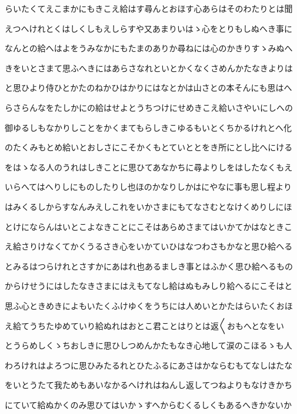\documentclass[a4paper,11pt,landscape]{ltjtarticle}
\begin{document}
\par\medskip
らいたくてえこまかにもきこえ給はす尋んとおほす心あらはそのわたりとは聞
\par\medskip
えつへけれとくはしくしもえしらすや又あまりいはゝ心をとりもしぬへき事に
\par\medskip
なんとの給へはよをうみなかにもたまのありか尋ねには心のかきりすゝみぬへ
\par\medskip
きをいとさまて思ふへきにはあらさなれといとかくなくさめんかたなきよりは
\par\medskip
と思ひより侍ひとかたのねかひはかりにはなとかは山さとの本そんにも思はへ
\par\medskip
らさらんなをたしかにの給はせよとうちつけにせめきこえ給いさやいにしへの
\par\medskip
御ゆるしもなかりしことをかくまてもらしきこゆるもいとくちかるけれとへ化
\par\medskip
のたくみもとめ給いとおしさにこそかくもとていととをき所にとし比へにける
\par\medskip
をはゝなる人のうれはしきことに思ひてあなかちに尋よりしをはしたなくもえ
\par\medskip
いらへてはへりしにものしたりし也ほのかなりしかはにやなに事も思し程より
\par\medskip
はみくるしからすなんみえしこれをいかさまにもてなさむとなけくめりしにほ
\par\medskip
とけにならんはいとこよなきことにこそはあらめさまてはいかてかはなときこ
\par\medskip
え給さりけなくてかくうるさき心をいかていひはなつわさもかなと思ひ給へる
\par\medskip
とみるはつらけれとさすかにあはれ也あるましき事とはふかく思ひ給へるもの
\par\medskip
からけせうにはしたなきさまにはえもてなし給はぬもみしり給へるにこそはと
\par\medskip
思ふ心ときめきによもいたくふけゆくをうちには人めいとかたはらいたくおほ
\par\medskip
え給てうちたゆめていり給ぬれはおとこ君ことはりとは返〱おもへとなをい
\par\medskip
とうらめしくゝちおしきに思ひしつめんかたもなき心地して涙のこほるゝも人
\par\medskip
わろけれはよろつに思ひみたるれとひたふるにあさはかならむもてなしはたな
\par\medskip
をいとうたて我ためもあいなかるへけれはねんし返してつねよりもなけきかち
\par\medskip
にていて給ぬかくのみ思ひてはいかゝすへからむくるしくもあるへきかないか
\end{document}
